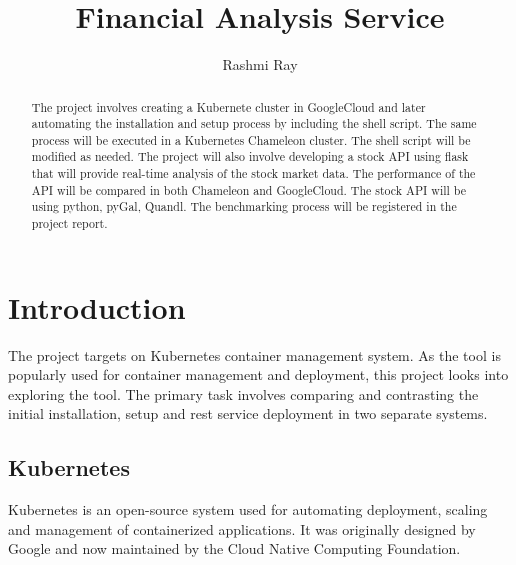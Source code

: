 
\title{Financial Analysis Service}

\author{Rashmi Ray}

\renewcommand{\shortauthors}{Uma Kugan}

\begin{abstract}
The project involves creating a Kubernete cluster in GoogleCloud and later 
automating the installation and setup process by including the shell script.
The same process will be executed in a Kubernetes Chameleon cluster. The shell
script will be modified as needed. The project will also involve developing a stock 
API using flask that will provide real-time analysis of the stock market data. The performance
of the API will be compared in both Chameleon and GoogleCloud. The stock API will 
be using python, pyGal, Quandl. The benchmarking process will be registered in the project report.

\end{abstract}



\maketitle

\section{Introduction}
The project targets on Kubernetes container management system. As the tool is popularly used
for container management and deployment, this project looks into exploring the tool.
The primary task involves comparing and contrasting the initial installation, 
setup and rest service deployment in two separate systems.  



\subsection{Kubernetes}
Kubernetes is an open-source system used for automating deployment, 
scaling and management of containerized applications. It was originally 
designed by Google and now maintained by the Cloud Native Computing 
Foundation.\cite{hid-sp18-417-kubernetes}

